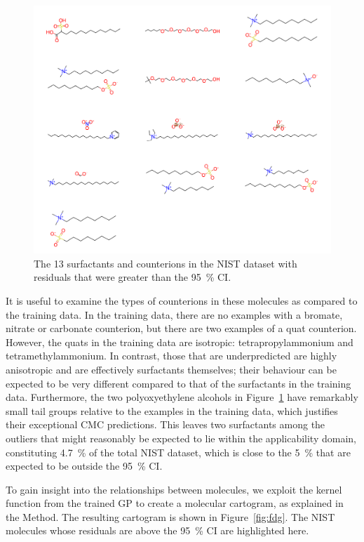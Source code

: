 \begin{figure}
    \includegraphics[width=\textwidth]{images/nist-underpred.pdf}
    \caption{The 13 surfactants and counterions in the NIST dataset with residuals
        that were greater than the \SI{95}{\%} CI.}
    \label{fig:nist-underpred}
\end{figure}

It is useful to examine the types of counterions in these molecules as compared
to the training data. In the training data, there are no examples with a
bromate, nitrate or carbonate counterion, but there are two examples of a quat
counterion. However, the quats in the training data are isotropic:
tetrapropylammonium and tetramethylammonium. In contrast, those that are
underpredicted are highly anisotropic and are effectively surfactants
themselves; their behaviour can be expected to be very different compared to
that of the surfactants in the training data. Furthermore, the two
polyoxyethylene alcohols in Figure~\ref{fig:nist-underpred} have remarkably
small tail groups relative to the examples in the training data, which justifies
their exceptional CMC predictions. This leaves two surfactants among the
outliers that might reasonably be expected to lie within the applicability
domain, constituting \SI{4.7}{\%} of the total NIST dataset, which is close to
the \SI{5}{\%} that are expected to be outside the \SI{95}{\%} CI.

To gain insight into the relationships between molecules, we exploit the kernel
function from the trained GP to create a molecular cartogram, as explained in
the Method. The resulting cartogram is shown in Figure~\ref{fig:fdg}. The NIST
molecules whose residuals are above the \SI{95}{\%} CI are highlighted here.

